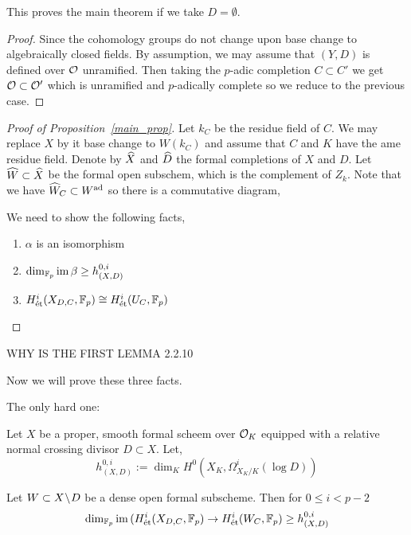 \documentclass[12pt]{article}
\begin{document}
This proves the main theorem if we take $D = \emptyset$.

\begin{proof}
Since the \etale cohomology groups do not change upon base change to algebraically closed fields. By assumption, we may assume that $(Y, D)$ is defined over $\mathcal{O}$ unramified. Then taking the $p$-adic completion $C \subset C'$ we get $\mathcal{O} \subset \mathcal{O}'$ which is unramified and $p$-adically complete so we reduce to the previous case.  
\end{proof}

\begin{proof}[Proof of Proposition~\ref{main_prop}]
Let $k_C$ be the residue field of $C$. We may replace $X$ by it base change to $W(k_C)$ and assume that $C$ and $K$ have the ame residue field. Denote by $\widehat{X}$ and $\widehat{D}$ the formal completions of $X$ and $D$. Let $\widehat{W} \subset \widehat{X}$ be the formal open subschem, which is the complement of $Z_k$. Note that we have $\widehat{W}_C \subset W^{\mathrm{ad}}$ so there is a commutative diagram,
\begin{center}
\end{center}
We need to show the following facts,
\begin{enumerate}
\item $\alpha$ is an isomorphism
\item $\dim_{\mathbb{F}_p} \operatorname{\mathrm{im}}{\beta} \ge h^{0,i}_{(X,D)}$
\item $H^i_{\text{\'{e}t}}(X_{D,C}, \mathbb{F}_p) \cong H^i_{\text{\'{e}t}}(U_C, \mathbb{F}_p)$
\end{enumerate}
\end{proof}

{\color{red} WHY IS THE FIRST LEMMA 2.2.10}

Now we will prove these three facts. 

The only hard one:

Let $X$ be a proper, smooth formal scheem over $\mathcal{O}_K$ equipped with a relative normal crossing divisor $D \subset X$. Let,
\[ h^{0,i}_{(X,D)} := \dim_K H^0(X_K, \Omega^i_{X_K/K}(\log{D})) \]

\begin{prop}
Let $W \subset X \! \setminus \! D$ be a dense open formal subscheme. Then for $0 \le i < p - 2$
\[ \dim_{\mathbb{F}_p} \operatorname{\mathrm{im}}{(H^i_{\text{\'{e}t}}(X_{D,C}, \mathbb{F}_p) \to H^i_{\text{\'{e}t}}(W_C, \mathbb{F}_p)} \ge h^{0,i}_{(X,D)} \]
\end{prop}
\end{document}
